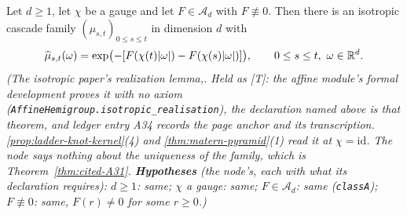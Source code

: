 \begin{theorem}
\label{thm:cited-A34}
\leanok
{}
Let $d \ge 1$, let $\chi$ be a gauge and let $F \in \mathcal{A}_d$ with $F \not\equiv 0$. Then
there is an isotropic cascade family $(\mu_{s,t})_{0 \le s \le t}$ in dimension $d$ with
\[
  \widehat\mu_{s,t}(\omega) = \exp\bigl(-[F(\chi(t)|\omega|) - F(\chi(s)|\omega|)]\bigr),
  \qquad 0 \le s \le t,\ \omega \in \mathbb{R}^d.
\]
\statusT\quad\emph{(The isotropic paper's realization lemma,.
Held as [T]: the affine module's formal development proves it with no axiom
(\texttt{AffineHemigroup.isotropic\_realisation}), the declaration named above is that theorem, and
ledger entry A34 records the page anchor and its transcription. \ref{prop:ladder-knot-kernel}(4) and
\ref{thm:matern-pyramid}(1) read it at $\chi = \mathrm{id}$. The node says nothing about the
uniqueness of the family, which is Theorem~\ref{thm:cited-A31}.
\textbf{Hypotheses} (the node's, each with what its declaration requires): $d \ge 1$: same; $\chi$ a
gauge: same; $F \in \mathcal{A}_d$: same (\texttt{classA}); $F \not\equiv 0$: same, $F(r) \ne 0$ for
some $r \ge 0$.)}
\end{theorem}

